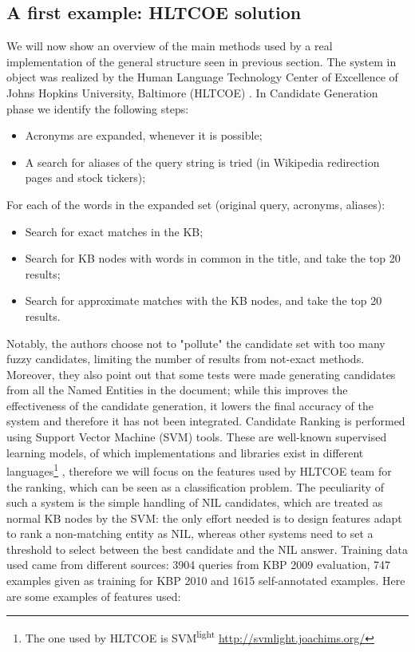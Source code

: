 \documentclass[a4paper,11pt]{report}
\begin{document}
\subsection{A first example: HLTCOE solution}
\label{sec:hltcoe}
We will now show an overview of the main methods used by a real implementation of the general structure seen in previous section. The system in object was realized by the Human Language Technology Center of Excellence of Johns Hopkins University, Baltimore (HLTCOE) \cite{2010hltcoe}.
In Candidate Generation phase we identify the following steps:
\begin{itemize}
\item Acronyms are expanded, whenever it is possible;
\item A search for aliases of the query string is tried (in Wikipedia redirection pages and stock tickers);
\end{itemize}
For each of the words in the expanded set (original query, acronyms, aliases):
\begin{itemize}
\item Search for exact matches in the KB;
\item Search for KB nodes with words in common in the title, and take the top 20 results;
\item Search for approximate matches with the KB nodes, and take the top 20 results.
\end{itemize}
Notably, the authors choose not to "pollute" the candidate set with too many fuzzy candidates, limiting the number of results from not-exact methods. Moreover, they also point out that some tests were made generating candidates from all the Named Entities in the document; while this improves the effectiveness of the candidate generation, it lowers the final accuracy of the system and therefore it has not been integrated.
Candidate Ranking is performed using Support Vector Machine (SVM) tools. These are well-known supervised learning models, of which implementations and libraries exist in different languages\footnote{The one used by HLTCOE is SVM\textsuperscript{light} \url{http://svmlight.joachims.org/}}
, therefore we will focus on the features used by HLTCOE team for the ranking, which can be seen as a classification problem. The peculiarity of such a system is the simple handling of NIL candidates, which are treated as normal KB nodes by the SVM: the only effort needed is to design features adapt to rank a non-matching entity as NIL, whereas other systems need to set a threshold to select between the best candidate and the NIL answer.
Training data used came from different sources: 3904 queries from KBP 2009 evaluation, 747 examples given as training for KBP 2010 and 1615 self-annotated examples.
Here are some examples of features used:
\end{document}
